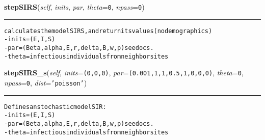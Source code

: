     \vspace{0.5ex}

    \begin{boxedminipage}{\textwidth}

    \raggedright \textbf{stepSIRS}(\textit{self}, \textit{inits}, \textit{par}, \textit{theta}=\texttt{0}, \textit{npass}=\texttt{0})

    \vspace{-1.5ex}

    \rule{\textwidth}{0.5\fboxrule}
\begin{alltt}

calculates the model SIRS, and return its values (no demographics)
- inits = (E,I,S)
- par = (Beta, alpha, E,r,delta,B, w, p) see docs.
- theta = infectious individuals from neighbor sites
\end{alltt}

    \vspace{1ex}

    \end{boxedminipage}

    \label{Epigrass:simobj:popmodels:stepSIRS_s}

    \vspace{0.5ex}

    \begin{boxedminipage}{\textwidth}

    \raggedright \textbf{stepSIRS\_s}(\textit{self}, \textit{inits}=\texttt{(0,0,0)}, \textit{par}=\texttt{(0.001,1,1,0.5,1,0,0,0)}, \textit{theta}=\texttt{0}, \textit{npass}=\texttt{0}, \textit{dist}=\texttt{'poisson'})

    \vspace{-1.5ex}

    \rule{\textwidth}{0.5\fboxrule}
\begin{alltt}

Defines an stochastic model SIR:
- inits = (E,I,S)
- par = (Beta, alpha, E,r,delta,B,w,p) see docs.
- theta = infectious individuals from neighbor sites
\end{alltt}

    \vspace{1ex}

    \end{boxedminipage}


